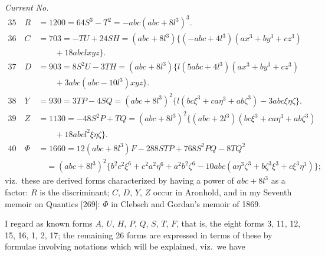 \documentclass[11pt,a4paper]{article}
\begin{document}
\medskip
\noindent\textit{Current No.}
\begin{align*}
  35\quad R &= 1200 = 64S^{3}-T^{2}=-abc(abc+8l^{3})^{3}.\\
  36\quad C &= 703 = -TU+24SH=(abc+8l^{3})\{(-abc+4l^{3})(ax^{3}+by^{3}+cz^{3})\\
   &\qquad +18abclxyz\}.\\
  37\quad D &= 903 = 8S^{2}U-3TH=(abc+8l^{3})\{l(5abc+4l^{3})(ax^{3}+by^{3}+cz^{3})\\
   &\qquad +3abc(abc-10l^{3})xyz\}.\\
  38\quad Y &= 930 = 3TP-4SQ=(abc+8l^{3})^{2}\{l(bc\xi^{3}+ca\eta^{3}+ab\zeta^{3})-3abc\xi\eta\zeta\}.\\
  39\quad Z &= 1130 = -48S^{2}P+TQ=(abc+8l^{3})^{2}\{(abc+2l^{3})(bc\xi^{3}+ca\eta^{3}+ab\zeta^{3})\\
   &\qquad +18abcl^{2}\xi\eta\zeta\}.\\
  40\quad \Phi &= 1660 = 12(abc+8l^{3})F-288STP+768S^{2}PQ-8TQ^{2}\\
   &\quad = (abc+8l^{3})^{2}\{b^{2}c^{2}\xi^{6}+c^{2}a^{2}\eta^{6}+a^{2}b^{2}\zeta^{6}-10abc(a\eta^{3}\zeta^{3}+b\zeta^{3}\xi^{3}+c\xi^{3}\eta^{3})\};
\end{align*}
viz.\ these are derived forms characterized by having a power of
$abc+8l^{3}$ as a factor: $R$ is the discriminant; $C$, $D$, $Y$, $Z$
occur in Aronhold, and in my Seventh memoir on Quantics [269]: $\Phi$
in Clebsch and Gordan's memoir of 1869.

I regard as known forms $A$, $U$, $H$, $P$, $Q$, $S$, $T$, $F$, that
is, the eight forms 3, 11, 12, 15, 16, 1, 2, 17; the remaining 26
forms are expressed in terms of these by formulae involving notations
which will be explained, viz.\ we have
\end{document}
